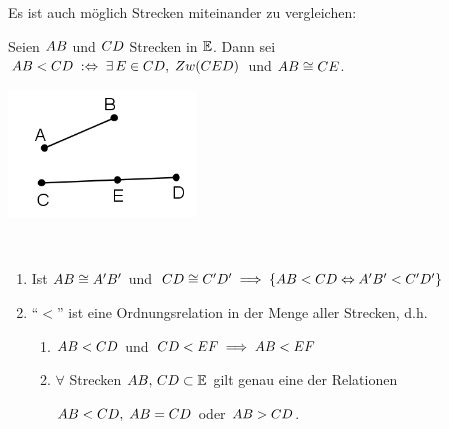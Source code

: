 Es ist auch möglich Strecken miteinander zu vergleichen:

\begin{defi}
    Seien ${AB}$ und ${CD}$ Strecken in $\mathbb E$. Dann sei ${AB} < {CD}\;:
    \Leftrightarrow\; \exists\, E \in {CD},\; Zw(CED)$ und ${AB} \cong {CE}$.
\end{defi}

\centerline{\includegraphics[width=5cm]{BILDER/1-2-05-Ord.png}}

\begin{thm}\label{thm:satz.s1g}\ %
    \renewcommand{\labelenumi}{\alph{enumi})} %
    \renewcommand{\labelenumii}{\alph{enumi}\textsubscript{\arabic{enumii}})}
    \begin{enumerate}
        \item\label{thm:satz.slg.item1} Ist ${AB} \cong {A'B'}$ und ${CD} \cong
            {C'D'}\; \Longrightarrow\; \{{AB} < {CD} \Leftrightarrow {A'B'} <
            {C'D'}\}$

        \item "`$ < $"' ist eine Ordnungsrelation in der Menge aller Strecken, d.h.
            \begin{enumerate}
                \item\label{thm:satz.slg.item2-1} ${AB} < {CD}$ und ${CD} < {EF}\;
                    \Longrightarrow \; {AB} < {EF}$

                \item\label{thm:satz.slg.item2-2} $\forall$ Strecken ${AB},\, {CD} \subset
                    \mathbb E$ gilt genau eine der Relationen

                    ${AB} < {CD},\; {AB} = {CD}$ oder ${AB}>{CD}$.
            \end{enumerate}
    \end{enumerate}
\end{thm}

